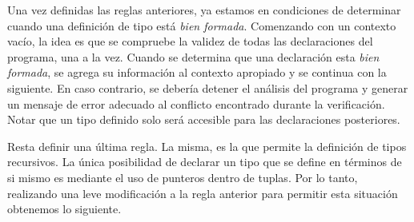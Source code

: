 \documentclass{article}
\begin{document}
Una vez definidas las reglas anteriores, ya estamos en condiciones de determinar cuando una definición de tipo está \textit{bien formada}.
Comenzando con un contexto vacío, la idea es que se compruebe la validez de todas las declaraciones del programa, una a la vez.
Cuando se determina que una declaración esta \textit{bien formada}, se agrega su información al contexto apropiado y se continua con la siguiente.
En caso contrario, se debería detener el análisis del programa y generar un mensaje de error adecuado al conflicto encontrado durante la verificación.
Notar que un tipo definido solo será accesible para las declaraciones posteriores.

\begin{prooftree}
\end{prooftree}

\begin{prooftree}
\end{prooftree}

\begin{prooftree}
\end{prooftree}

Resta definir una última regla.
La misma, es la que permite la definición de tipos recursivos.
La única posibilidad de declarar un tipo que se define en términos de si mismo es mediante el uso de punteros dentro de tuplas.
Por lo tanto, realizando una leve modificación a la regla anterior para permitir esta situación obtenemos lo siguiente.

\begin{prooftree}
\end{prooftree}
\end{document}
